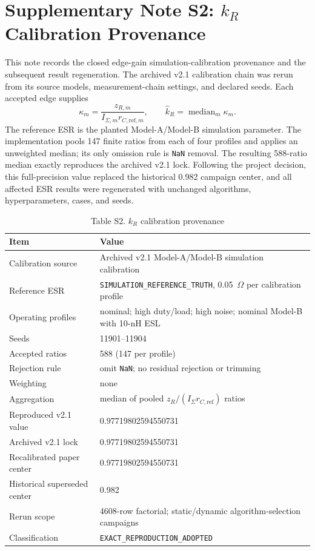 \section*{Supplementary Note S2: $k_R$ Calibration Provenance}

This note records the closed edge-gain simulation-calibration provenance and the subsequent result regeneration. The archived v2.1 calibration chain was rerun from its source models, measurement-chain settings, and declared seeds. Each accepted edge supplies
\[
\kappa_m=\frac{z_{R,m}}{I_{\Sigma,m}r_{C,\mathrm{ref},m}},
\qquad
\hat k_R=\operatorname{median}_m\kappa_m.
\]
The reference ESR is the planted Model-A/Model-B simulation parameter. The implementation pools 147 finite ratios from each of four profiles and applies an unweighted median; its only omission rule is \texttt{NaN} removal. The resulting 588-ratio median exactly reproduces the archived v2.1 lock. Following the project decision, this full-precision value replaced the historical 0.982 campaign center, and all affected ESR results were regenerated with unchanged algorithms, hyperparameters, cases, and seeds.

\begin{table}[h]
\caption*{Table S2. $k_R$ calibration provenance}
\centering
\footnotesize
\begin{tabular}{p{4.2cm}p{7.0cm}}
\toprule
Item & Value \\
\midrule
Calibration source & Archived v2.1 Model-A/Model-B simulation calibration \\
Reference ESR & \texttt{SIMULATION\_REFERENCE\_TRUTH}, 0.05~$\Omega$ per calibration profile \\
Operating profiles & nominal; high duty/load; high noise; nominal Model-B with 10-nH ESL \\
Seeds & 11901--11904 \\
Accepted ratios & 588 (147 per profile) \\
Rejection rule & omit \texttt{NaN}; no residual rejection or trimming \\
Weighting & none \\
Aggregation & median of pooled $z_R/(I_\Sigma r_{C,\mathrm{ref}})$ ratios \\
Reproduced v2.1 value & 0.97719802594550731 \\
Archived v2.1 lock & 0.97719802594550731 \\
Recalibrated paper center & 0.97719802594550731 \\
Historical superseded center & 0.982 \\
Rerun scope & 4608-row factorial; static/dynamic algorithm-selection campaigns \\
Classification & \texttt{EXACT\_REPRODUCTION\_ADOPTED} \\
\bottomrule
\end{tabular}
\end{table}

